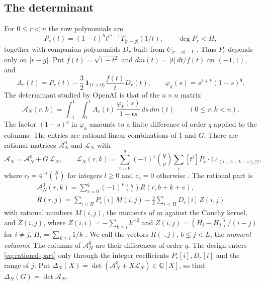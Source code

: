 \documentclass[11pt]{amsart}
\theoremstyle{definition}
\theoremstyle{remark}
\numberwithin{equation}{section}
\newcommand{\Q}{\mathbb Q}
\newcommand{\cA}{\mathcal A}
\newcommand{\cL}{\mathcal L}
\begin{document}
\subsection{The determinant}
For $0\le r<n$ the row polynomials are
\begin{equation}\label{eq:rows}
 P_r(t)=(1-t)^ht^{C-1}T_{|r-g|}(1/t),\qquad \deg P_r<H,
\end{equation}
together with companion polynomials $D_r$ built from $U_{|r-g|-1}$ \cite[(3)]{OpenAI2026}. Thus $P_r$
depends only on $|r-g|$. Put $f(t)=\sqrt{1-t^2}$ and $dm(t)=|t|\,dt/f(t)$ on $(-1,1)$, and
\[
 A_r(t)=P_r(t)-\frac32\,\mathbf 1_{\{t>0\}}\frac{f(t)}{t}D_r(t),\qquad
 \varphi_k(s)=s^{b+k}(1-s)^q .
\]
The determinant studied by OpenAI is that of the $n\times n$ matrix
\begin{equation}\label{eq:matrix}
 \cA_N(r,k)=\int_{-1}^1\int_0^1 A_r(t)\,\frac{\varphi_k(s)}{1-ts}\,ds\,dm(t)
 \qquad(0\le r,k<n).
\end{equation}
The factor $(1-s)^q$ in $\varphi_k$ amounts to a finite difference of order $q$ applied to the columns. The
entries are rational linear combinations of $1$ and $G$. There are rational matrices $\cA^0_N$ and $\cL_N$
with
\begin{equation}\label{eq:L}
 \cA_N=\cA^0_N+G\,\cL_N,\qquad
 \cL_N(r,k)=\sum_{v=0}^{q}(-1)^v\binom qv\sum_{i}[t^i]P_r\cdot4\,c_{(i-b-k-v)/2},
\end{equation}
where $c_l=4^{-l}\binom{2l}{l}$ for integers $l\ge0$ and $c_z=0$ otherwise
\cite[Prop.~2.1 and (20)]{OpenAI2026}. The rational part is
\begin{equation}\label{eq:rational-part}
 \begin{gathered}
 \cA^0_N(r,k)=\sum_{v=0}^q(-1)^v\binom qv R(r,b+k+v),\\
 R(r,j)=\sum_{i<H}P_r[i]\,M(i,j)-\frac32\sum_{i<H}D_r[i]\,Z(i,j)
 \end{gathered}
\end{equation}
with rational numbers $M(i,j)$, the moments of $m$ against the Cauchy kernel, and $Z(i,j)$, where
$Z(i,i)=-\sum_{k\le i}k^{-2}$ and $Z(i,j)=(H_i-H_j)/(i-j)$ for $i\ne j$, $H_i=\sum_{k\le i}1/k$
\cite[Prop.~2.1]{OpenAI2026}. We call the vectors $R(\cdot,j)$, $b\le j<L$, the \emph{moment columns}. The
columns of $\cA^0_N$ are their differences of order $q$. The design enters \eqref{eq:rational-part} only
through the integer coefficients $P_r[i],D_r[i]$ and the range of $j$. Put
$\Delta_N(X)=\det(\cA^0_N+X\cL_N)\in\Q[X]$, so that $\Delta_N(G)=\det\cA_N$.
\end{document}
